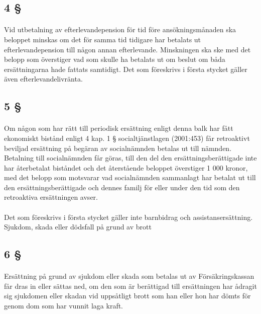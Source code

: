 \documentclass[a4paper,notitlepage,openany,10pt]{book}
\begin{document}
\subsection*{4 §}
\paragraph*{}
Vid utbetalning av efterlevandepension för tid före ansökningsmånaden ska beloppet minskas om det för samma tid tidigare har betalats ut efterlevandepension till någon annan efterlevande. Minskningen ska ske med det belopp som överstiger vad som skulle ha betalats ut om beslut om båda ersättningarna hade fattats samtidigt.
Det som föreskrivs i första stycket gäller även efterlevandelivränta.
\subsection*{5 §}
\paragraph*{}
Om någon som har rätt till periodisk ersättning enligt denna balk har fått ekonomiskt bistånd enligt 4 kap. 1 § socialtjänstlagen (2001:453) får retroaktivt beviljad ersättning på begäran av socialnämnden betalas ut till nämnden. Betalning till socialnämnden får göras, till den del den ersättningsberättigade inte har återbetalat biståndet och det återstående beloppet överstiger 1 000 kronor, med det belopp som motsvarar vad socialnämnden sammanlagt har betalat ut till den ersättningsberättigade och dennes familj för eller under den tid som den retroaktiva ersättningen avser.
\paragraph*{}
Det som föreskrivs i första stycket gäller inte barnbidrag och assistansersättning.
Sjukdom, skada eller dödsfall på grund av brott
\subsection*{6 §}
\paragraph*{}
Ersättning på grund av sjukdom eller skada som betalas ut av Försäkringskassan får dras in eller sättas ned, om den som är berättigad till ersättningen har ådragit sig sjukdomen eller skadan vid uppsåtligt brott som han eller hon har dömts för genom dom som har vunnit laga kraft.
\end{document}
